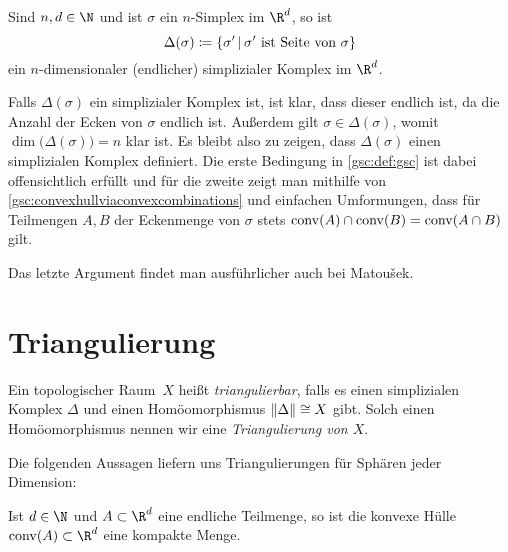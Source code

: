 \begin{thLemma}
    \label{gsc:complexofsimplex}
    Sind $n,d\in\N$ und ist $\sigma$ ein $n$-Simplex im $\R^d$, so ist
    \[ \Delta(\sigma) 
        \defeq \{ \sigma' \Mid \sigma' \text{ ist Seite von } \sigma \}
    \]
    ein $n$-dimensionaler (endlicher) simplizialer Komplex im $\R^d$.
\end{thLemma}

\begin{proofsketch}
    Falls $\Delta(\sigma)$ ein simplizialer Komplex ist, ist klar, dass dieser
    endlich ist, da die Anzahl der Ecken von $\sigma$ endlich ist. Außerdem gilt
    $\sigma\in\Delta(\sigma)$, womit $\dim\bigl(\Delta(\sigma)\bigr) = n$ klar
    ist. Es bleibt also zu zeigen, dass $\Delta(\sigma)$ einen simplizialen
    Komplex definiert. Die erste Bedingung in \cref{gsc:def:gsc} ist dabei
    offensichtlich erfüllt und für die zweite zeigt man mithilfe von
    \cref{gsc:convexhullviaconvexcombinations} und einfachen Umformungen, dass
    für Teilmengen $A,B$ der Eckenmenge von $\sigma$ stets $\operatorname{conv}(A)\cap\operatorname{conv}(B)
    = \operatorname{conv}(A\cap B)$ gilt.
    \\
\end{proofsketch}

Das letzte Argument findet man ausführlicher auch bei 
Matou\v sek\cite[Ch.\,1,.6]{bookc:matousek03}.


\section{Triangulierung}
\begin{thDef}
    Ein topologischer Raum~$X$ heißt \emph{triangulierbar}, falls es
    einen simplizialen Komplex $\Delta$ und einen Homöomorphismus
    $\lVert\Delta\rVert \cong X$ gibt. Solch einen Homöomorphismus nennen wir 
    eine \emph{Triangulierung von $X$}.
\end{thDef}

Die folgenden Aussagen liefern uns Triangulierungen für Sphären jeder
Dimension:

\begin{thLemma}
    \label{gsc:convexhullcompact}
    Ist $d\in\N$ und $A\subset\R^d$ eine endliche Teilmenge, so ist die konvexe
    Hülle $\conv(A)\subset\R^d$ eine kompakte Menge.
\end{thLemma}

